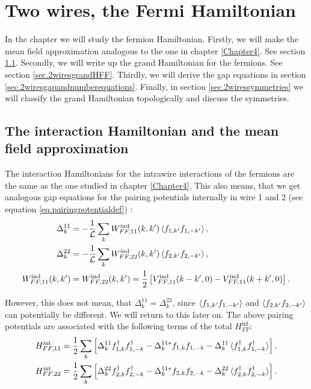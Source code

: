 
\chapter{Two wires, the Fermi Hamiltonian} %

\label{Chapter9} %


In the chapter we will study the fermion Hamiltonian. Firstly, we will make the mean field approximation analogous to the one in chapter \ref{Chapter4}. See section \ref{sec.2wiresmeanfieldapproximation}. Secondly, we will write up the grand Hamiltonian for the fermions. See section \ref{sec.2wiresgrandHFF}. Thirdly, we will derive the gap equations in section \ref{sec.2wiresgapandnumberequations}. Finally, in section \ref{sec.2wiressymmetries} we will classify the grand Hamiltonian topologically and discuss the symmetries. 

\section{The interaction Hamiltonian and the mean field approximation}
\label{sec.2wiresmeanfieldapproximation}
The interaction Hamiltonians for the intrawire interactions of the fermions are the same as the one studied in chapter \ref{Chapter4}. This also means, that we get analogous gap equations for the pairing potentials internally in wire 1 and 2 (see equation \ref{eq.pairingpotentialdef}) :
\begin{align}
\Delta^{11}_k &= -\frac{1}{\mathcal{L}} \sum_k W^\text{ind}_{FF,11}(k,k')\braket{f_{1,k'}f_{1,-k'}}, \nonumber \\
\Delta^{22}_k &= -\frac{1}{\mathcal{L}} \sum_k W^\text{ind}_{FF,22}(k,k')\braket{f_{2,k'}f_{2,-k'}}, \nonumber \\
W^\text{ind}_{FF,11}(k,k') &= W^\text{ind}_{FF,22}(k,k') = \frac{1}{2}\left[V^\text{ind}_{FF,11}(k-k',0) - V^\text{ind}_{FF,11}(k+k',0) \right].
\label{eq.pairingpotentialsintrawire}
\end{align}

However, this does not mean, that $\Delta^{11}_k = \Delta^{22}_k$, since $\braket{f_{1,k'}f_{1,-k'}}$ and $\braket{f_{2,k'}f_{2,-k'}}$ can potentially be different. We will return to this later on. The above pairing potentials are associated with the following terms of the total $H^\text{int}_{FF}$:
\begin{align}
H^\text{int}_{FF,11} &= \frac{1}{2}\sum_k \left[\Delta^{11}_k f^\dagger_{1,k}f^\dagger_{1,-k} - \Delta^{11 *}_k f_{1,k}f_{1,-k} - \Delta^{11}_k\braket{f^\dagger_{1,k}f^\dagger_{1,-k}} \right], \nonumber \\
H^\text{int}_{FF,22} &= \frac{1}{2}\sum_k \left[\Delta^{22}_k f^\dagger_{2,k}f^\dagger_{2,-k} - \Delta^{11 *}_k f_{2,k}f_{2,-k} - \Delta^{22}_k\braket{f^\dagger_{2,k}f^\dagger_{2,-k}} \right].
\label{eq.Hintintrawire}
\end{align}

